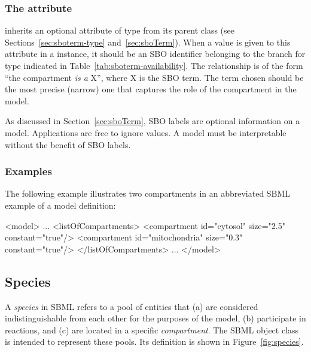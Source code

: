 \subsubsection{The  attribute}
\label{sec:compartment-sboterm}

\Compartment inherits an optional 
attribute of type  from its parent
class \SBase (see Sections~\ref{sec:sboterm-type}
and~\ref{sec:sboTerm}).  When a value is given to this
attribute in a \Compartment instance, it should be an
SBO identifier belonging to the branch for type \Compartment 
indicated in Table~\ref{tab:sboterm-availability}.  The relationship is
of the form ``the compartment  \emph{is a} X'', where X is
the SBO term.  The term chosen should be the most precise (narrow)
one that captures the role of the compartment in the model.

As discussed in Section~\ref{sec:sboTerm}, SBO labels are optional
information on a model.  Applications are free to ignore
 values.  A model must be interpretable without the
benefit of SBO labels.


\subsubsection{Examples}

The following example illustrates two compartments in an
abbreviated SBML example of a model definition:

\begin{example}
<model>
    ...
    <listOfCompartments>
        <compartment id="cytosol" size="2.5" constant="true"/>
        <compartment id="mitochondria" size="0.3" constant="true"/>
    </listOfCompartments>
    ...
</model>
\end{example}


\subsection{Species}
\label{sec:species}

A \emph{species} in SBML refers to a pool of entities that (a) are
considered indistinguishable from each other for the purposes of
the model, (b) participate in reactions, and (c) are located in a
specific \emph{compartment}.  The SBML \Species object class is
intended to represent these pools.  Its definition is shown in
Figure~\ref{fig:species}.

